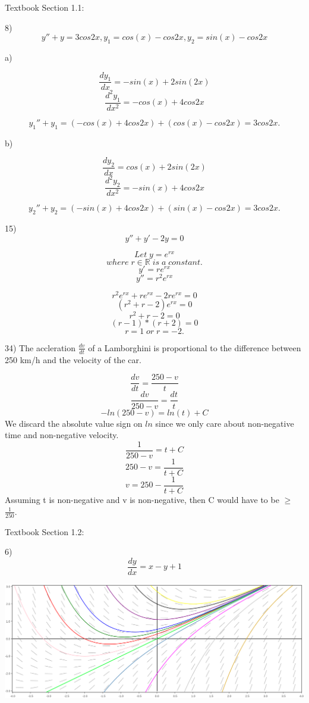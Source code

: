 \documentclass{article}
\begin{document}
Textbook Section 1.1:

8) \[y'' + y = 3cos2x, y_1 = cos(x) - cos2x, y_2 = sin(x) - cos2x\]

\indent \indent a)

\[\frac{dy_1}{dx} = -sin(x) + 2sin(2x)\]
\[\frac{d^2y_1}{dx^2} = -cos(x) + 4cos2x\]

\[y_1'' + y_1 = (-cos(x) + 4cos2x) + (cos(x) - cos2x) = 3cos2x.\]


\indent \indent b)

\[\frac{dy_2}{dx} = cos(x) + 2sin(2x)\]
\[\frac{d^2y_2}{dx^2} = -sin(x) + 4cos2x\]

\[y_2'' + y_2 = (-sin(x) + 4cos2x) + (sin(x) - cos2x) = 3cos2x.\]



15) \[y'' + y' - 2y = 0\]

\[Let \; y = e^{rx}\]
\[ where \; r \in \mathbb{R} \; is \; a \; constant.\]
\[y' = re^{rx}\]
\[y'' = r^2e^{rx}\]

\[r^2e^{rx} + re^{rx} - 2re^{rx} = 0\]
\[(r^2 + r - 2)e^{rx} = 0\]
\[r^2 + r - 2 = 0\]
\[(r-1)*(r+2) = 0\]
\[r = 1 \; or \; r = -2.\]



34) The accleration $\frac{dv}{dt}$ of a Lamborghini is proportional to the
  difference between 250 km/h and the velocity of the car.


\[\frac{dv}{dt} = \frac{250 - v}{t}\]
\[\frac{dv}{250-v} = \frac{dt}{t}\]
\[-ln(250-v) = ln(t) + C\]
We discard the absolute value sign on $ln$ since we only care about
non-negative time and non-negative velocity.
\[\frac{1}{250-v} = t + C\]
\[250-v = \frac{1}{t + C}\]
\[v = 250 - \frac{1}{t + C}\]
Assuming t is non-negative and v is non-negative, then C would have to be $\geq$ $\frac{1}{250}$.


\hspace{1cm}

Textbook Section 1.2:

6) \[\frac{dy}{dx} = x - y + 1\]


\includegraphics[width=\linewidth]{x_minus_y_plus_1}
\end{document}
